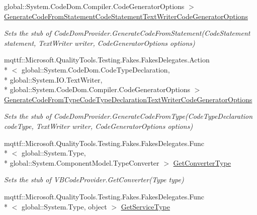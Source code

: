 \begin{DoxyCompactItemize}
global\-::\-System.\-Code\-Dom.\-Compiler.\-Code\-Generator\-Options $>$ \hyperlink{class_microsoft_1_1_visual_basic_1_1_fakes_1_1_stub_v_b_code_provider_a4e212efe0aa9d83574f459f0892047ef}{Generate\-Code\-From\-Statement\-Code\-Statement\-Text\-Writer\-Code\-Generator\-Options}
\begin{DoxyCompactList}\small\item\em Sets the stub of Code\-Dom\-Provider.\-Generate\-Code\-From\-Statement(\-Code\-Statement statement, Text\-Writer writer, Code\-Generator\-Options options)\end{DoxyCompactList}\item 
mqttf\-::\-Microsoft.\-Quality\-Tools.\-Testing.\-Fakes.\-Fakes\-Delegates.\-Action\\*
$<$ global\-::\-System.\-Code\-Dom.\-Code\-Type\-Declaration, \\*
global\-::\-System.\-I\-O.\-Text\-Writer, \\*
global\-::\-System.\-Code\-Dom.\-Compiler.\-Code\-Generator\-Options $>$ \hyperlink{class_microsoft_1_1_visual_basic_1_1_fakes_1_1_stub_v_b_code_provider_a37302505334a994672a3cf0d896c243c}{Generate\-Code\-From\-Type\-Code\-Type\-Declaration\-Text\-Writer\-Code\-Generator\-Options}
\begin{DoxyCompactList}\small\item\em Sets the stub of Code\-Dom\-Provider.\-Generate\-Code\-From\-Type(\-Code\-Type\-Declaration code\-Type, Text\-Writer writer, Code\-Generator\-Options options)\end{DoxyCompactList}\item 
mqttf\-::\-Microsoft.\-Quality\-Tools.\-Testing.\-Fakes.\-Fakes\-Delegates.\-Func\\*
$<$ global\-::\-System.\-Type, \\*
global\-::\-System.\-Component\-Model.\-Type\-Converter $>$ \hyperlink{class_microsoft_1_1_visual_basic_1_1_fakes_1_1_stub_v_b_code_provider_a5d023b1a99fb344137c125acc8803517}{Get\-Converter\-Type}
\begin{DoxyCompactList}\small\item\em Sets the stub of V\-B\-Code\-Provider.\-Get\-Converter(\-Type type)\end{DoxyCompactList}\item 
mqttf\-::\-Microsoft.\-Quality\-Tools.\-Testing.\-Fakes.\-Fakes\-Delegates.\-Func\\*
$<$ global\-::\-System.\-Type, object $>$ \hyperlink{class_microsoft_1_1_visual_basic_1_1_fakes_1_1_stub_v_b_code_provider_a8e7d7711703851f0563d2f8751f513e4}{Get\-Service\-Type}

\end{DoxyCompactItemize}
